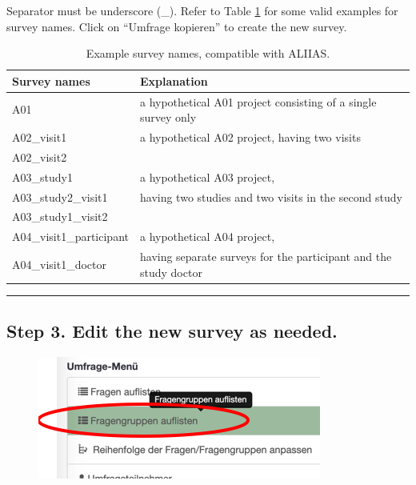 Separator must be underscore (\_). Refer to Table \ref{tab:example_names} for some valid examples for survey names. Click on “Umfrage kopieren” to create the new survey.
\begin{table}[h]
 \caption{Example survey names, compatible with ALIIAS.}
  \centering
  \begin{tabular}{ll}
    \toprule
    Survey names      & Explanation      \\
    \midrule
    \midrule
    A01            & a hypothetical A01 project consisting of a single survey only                 \\
    \midrule
    A02\_visit1           & a hypothetical A02 project, having two visits \\
    A02\_visit2      & \\
    \midrule
    A03\_study1           & a hypothetical A03 project,               \\
    A03\_study2\_visit1          &  having two studies and two visits in the second study              \\
    A03\_study1\_visit2           &                \\
    \midrule
    A04\_visit1\_participant      &   a hypothetical A04 project,             \\
    A04\_visit1\_doctor           &   having separate surveys for the participant and the study doctor           \\
    \bottomrule
  \end{tabular}
  \label{tab:example_names}
\end{table}

\par\noindent\rule{\textwidth\color{pniblue}}{0.4pt}
\subsection*{Step 3. Edit the new survey as needed. }

\begin{figure}
\centering
\includegraphics{docs/fig/ls_sop3.png}
\end{figure}

